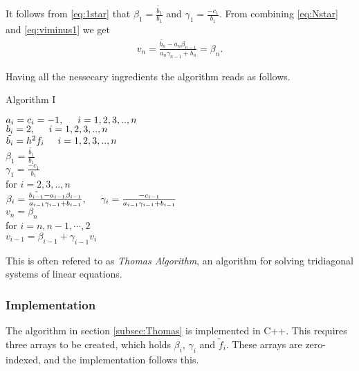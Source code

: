 \documentclass[11pt,a4paper,english,final]{article}
\numberwithin{equation}{section}
\begin{document}
It follows from \eqref{eq:1star} that $\beta_1 = \frac{\tilde{b_1}}{b_1}$ and $\gamma_1 = \frac{-c_1}{b_1}$.
From combining \eqref{eq:Nstar} and \eqref{eq:viminus1} we get 
\begin{align*}
v_n = \frac{\tilde{b_n}-a_n \beta_{n-1}}{a_n \gamma_{n-1} + b_n} = \beta_{n}.
\end{align*}

Having all the nessecary ingredients the algorithm reads as follows.
\vspace{0.5cm}

\centerline{Algorithm I}
\begin{tcolorbox}
$a_i = c_i = -1, \hspace{0.5cm}  i=1,2,3,..,n$\\
$b_i = 2, \hspace{0.5cm}  i=1,2,3,..,n $\\
$\tilde{b_i} = h^2 f_i \hspace{0.5cm}  i=1,2,3,..,n $\\
$\beta_1 = \frac{\tilde{b_1}}{b_1}$ \\
$\gamma_1 = \frac{-c_1}{b_1}$ \\
for $i=2,3,..,n$ \\ \vspace{0.5cm} 
 \hspace{0.5cm} $ \beta_{i} = \frac{\tilde{b_{i-1}}-a_{i-1} \beta_{i-1}}{a_{i-1} \gamma_{i-1} + b_{i-1}} , \hspace{0.5cm} \gamma_{i}=\frac{-c_{i-1}}{a_{i-1} \gamma_{i-1} + b_{i-1}} $ \vspace{0.2cm}  \\
 $v_{n} = \beta_{n}$\\
for $i=n, n-1, \cdots ,2$\\ \vspace{0.5cm} 
 \hspace{0.5cm} $v_{i-1} = \beta_{i-1} + \gamma_{i-1} v_i$
\end{tcolorbox} 


This is often refered to as \emph{Thomas Algorithm}, an algorithm for solving tridiagonal systems of linear equations. 

\subsubsection{Implementation}

The algorithm in section \ref{subsec:Thomas} is implemented in C++.
This requires three arrays to be created, which holds $\beta_i$, $\gamma_i$
and $\tilde{f}_i$. These arrays are zero-indexed, and the implementation
follows this.
\end{document}
